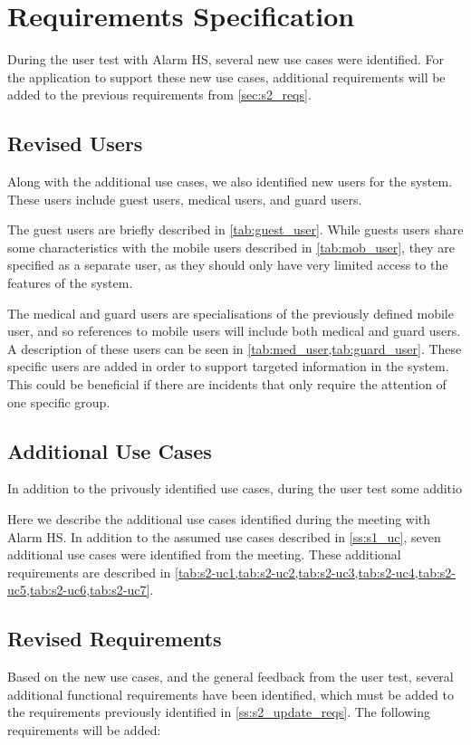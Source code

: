 \section{Requirements Specification} \label{sec:s3_requirements}
During the user test with Alarm HS, several new use cases were identified. For the application to support these new use cases, additional requirements will be added to the previous requirements from \cref{sec:s2_reqs}.

\subsection{Revised Users} \label{ss:s3_users}
Along with the additional use cases, we also identified new users for the system. These users include guest users, medical users, and guard users.

The guest users are briefly described in \cref{tab:guest_user}. While guests users share some characteristics with the mobile users described in \cref{tab:mob_user}, they are specified as a separate user, as they should only have very limited access to the features of the system.

The medical and guard users are specialisations of the previously defined mobile user, and so references to mobile users will include both medical and guard users. A description of these users can be seen in \cref{tab:med_user,tab:guard_user}. These specific users are added in order to support targeted information in the system. This could be beneficial if there are incidents that only require the attention of one specific group.



\subsection{Additional Use Cases \label{ss:s3_uc}}
In addition to the privously identified use cases, during the user test some additio


Here we describe the additional use cases identified during the meeting with Alarm HS. In addition to the assumed use cases described in \cref{ss:s1_uc}, seven additional use cases were identified from the meeting. These additional requirements are described in \cref{tab:s2-uc1,tab:s2-uc2,tab:s2-uc3,tab:s2-uc4,tab:s2-uc5,tab:s2-uc6,tab:s2-uc7}.




\subsection{Revised Requirements} \label{ss:s2_reqs}
Based on the new use cases, and the general feedback from the user test, several additional functional requirements have been identified, which must be added to the requirements previously identified in \cref{ss:s2_update_reqs}. The following requirements will be added:

